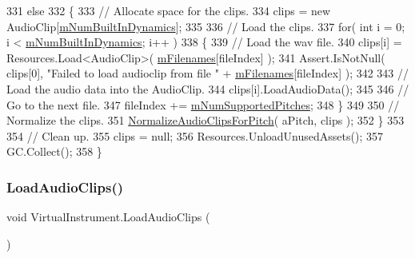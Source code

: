 \begin{DoxyCode}
331         \textcolor{keywordflow}{else}
332         \{
333             \textcolor{comment}{// Allocate space for the clips.}
334             clips = \textcolor{keyword}{new} AudioClip[\hyperlink{group___v_i_base_pro_var_gac265f64f759d267ee1e1680f8d387011}{mNumBuiltInDynamics}];
335 
336             \textcolor{comment}{// Load the clips.}
337             \textcolor{keywordflow}{for}( \textcolor{keywordtype}{int} i = 0; i < \hyperlink{group___v_i_base_pro_var_gac265f64f759d267ee1e1680f8d387011}{mNumBuiltInDynamics}; i++ )
338             \{
339                 \textcolor{comment}{// Load the wav file.}
340                 clips[i] = Resources.Load<AudioClip>( \hyperlink{group___v_i_base_pro_var_gab2add474ca506357688b5dd08cac4cb5}{mFilenames}[fileIndex] );
341                 Assert.IsNotNull( clips[0], \textcolor{stringliteral}{"Failed to load audioclip from file "} + 
      \hyperlink{group___v_i_base_pro_var_gab2add474ca506357688b5dd08cac4cb5}{mFilenames}[fileIndex] );
342 
343                 \textcolor{comment}{// Load the audio data into the AudioClip.}
344                 clips[i].LoadAudioData();
345 
346                 \textcolor{comment}{// Go to the next file.}
347                 fileIndex += \hyperlink{group___v_i_base_pro_var_gafc759a16324cf9b3f230bcbf040afcd2}{mNumSupportedPitches};
348             \}
349 
350             \textcolor{comment}{// Normalize the clips.}
351             \hyperlink{group___v_i_base_priv_func_gaecd4f9ead08a03be878b2085055a975c}{NormalizeAudioClipsForPitch}( aPitch, clips );
352         \}
353 
354         \textcolor{comment}{// Clean up.}
355         clips = null;
356         Resources.UnloadUnusedAssets();
357         GC.Collect();
358     \}
\end{DoxyCode}
\mbox{\label{group___v_i_base_pro_func_ga873242f52d077ca4305b0b69a0100b55}} 
\subsubsection{\texorpdfstring{Load\+Audio\+Clips()}{LoadAudioClips()}}
{\footnotesize\ttfamily void Virtual\+Instrument.\+Load\+Audio\+Clips (\begin{DoxyParamCaption}{ }\end{DoxyParamCaption})\hspace{0.3cm}{\ttfamily [protected]}}



